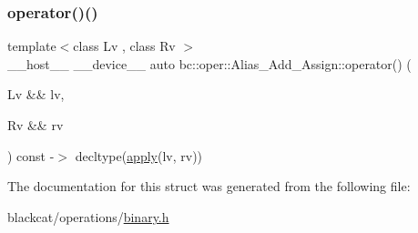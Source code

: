 \mbox{\label{structbc_1_1oper_1_1Alias__Add__Assign_a9c4d04d195e67d0954492766740f4774}} 
\subsubsection{\texorpdfstring{operator()()}{operator()()}}
{\footnotesize\ttfamily template$<$class Lv , class Rv $>$ \\
\+\_\+\+\_\+host\+\_\+\+\_\+ \+\_\+\+\_\+device\+\_\+\+\_\+ auto bc\+::oper\+::\+Alias\+\_\+\+Add\+\_\+\+Assign\+::operator() (\begin{DoxyParamCaption}\item[{Lv \&\&}]{lv,  }\item[{Rv \&\&}]{rv }\end{DoxyParamCaption}) const -\/$>$ decltype(\hyperlink{structbc_1_1oper_1_1Alias__Add__Assign_ada0a058271a4a854408a2eb86c1bb2e1}{apply}(lv, rv)) \hspace{0.3cm}{\ttfamily [inline]}}



The documentation for this struct was generated from the following file\+:\begin{DoxyCompactItemize}
\item 
blackcat/operations/\hyperlink{binary_8h}{binary.\+h}\end{DoxyCompactItemize}
